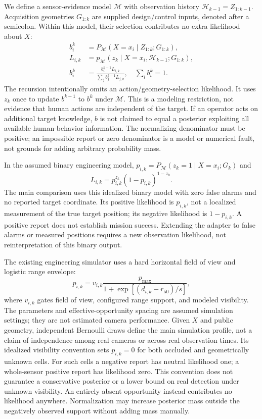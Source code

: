 \documentclass[conference]{IEEEtran}
\begin{document}
We define a sensor-evidence model $\mathcal M$ with observation history $\mathcal H_{k-1}=Z_{1:k-1}$. Acquisition geometries $G_{1:k}$ are supplied design/control inputs, denoted after a semicolon. Within this model, their selection contributes no extra likelihood about $X$:
\begin{align}
 b_i^k&=P_{\mathcal M}(X=x_i\mid Z_{1:k};G_{1:k}),\\
 L_{i,k}&=p_{\mathcal M}(z_k\mid X=x_i,\mathcal H_{k-1};G_{1:k}),\\
 b_i^k&=\frac{b_i^{k-1}L_{i,k}}{\sum_j b_j^{k-1}L_{j,k}},\quad \sum_i b_i^k=1.
\label{eq:bayes}
\end{align}
The recursion intentionally omits an action/geometry-selection likelihood. It uses $z_k$ once to update $b^{k-1}$ to $b^k$ under $\mathcal M$. This is a modeling restriction, not evidence that human actions are independent of the target. If an operator acts on additional target knowledge, $b$ is not claimed to equal a posterior exploiting all available human-behavior information. The normalizing denominator must be positive; an impossible report or zero denominator is a model or numerical fault, not grounds for adding arbitrary probability mass.

In the assumed binary engineering model, $p_{i,k}=P_{\mathcal M}(z_k=1\mid X=x_i;G_k)$ and
\begin{equation}
 L_{i,k}=p_{i,k}^{z_k}(1-p_{i,k})^{1-z_k}.
\label{eq:binary}
\end{equation}
The main comparison uses this idealized binary model with zero false alarms and no reported target coordinate. Its positive likelihood is $p_{i,k}$, not a localized measurement of the true target position; its negative likelihood is $1-p_{i,k}$. A positive report does not establish mission success. Extending the adapter to false alarms or measured positions requires a new observation likelihood, not reinterpretation of this binary output.

The existing engineering simulator uses a hard horizontal field of view and logistic range envelope:
\begin{equation}
 p_{i,k}=v_{i,k}\frac{p_{\max}}{1+\exp[(d_{i,k}-r_{50})/s]},
\label{eq:pd}
\end{equation}
where $v_{i,k}$ gates field of view, configured range support, and modeled visibility. The parameters and effective-opportunity spacing are assumed simulation settings; they are not estimated camera performance. Given $X$ and public geometry, independent Bernoulli draws define the main simulation profile, not a claim of independence among real cameras or across real observation times. Its idealized visibility convention sets $p_{i,k}=0$ for both occluded and geometrically unknown cells. For such cells a negative report has neutral likelihood one; a whole-sensor positive report has likelihood zero. This convention does not guarantee a conservative posterior or a lower bound on real detection under unknown visibility. An entirely absent opportunity instead contributes no likelihood anywhere. Normalization may increase posterior mass outside the negatively observed support without adding mass manually.
\end{document}
